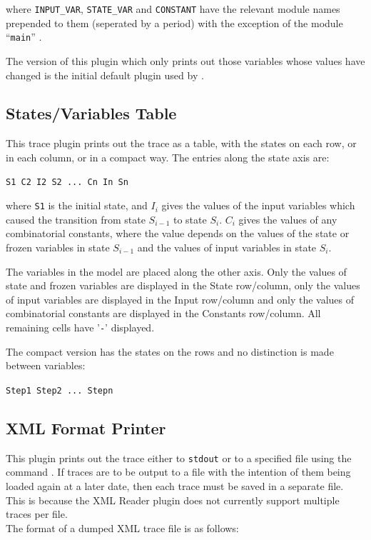 where \texttt{INPUT\_VAR}, \texttt{STATE\_VAR} and \texttt{CONSTANT}
have the relevant module names prepended to them (seperated by a
period) with the exception of the module ``\texttt{main}'' .

The version of this plugin which only prints out those variables whose
values have changed is the initial default plugin used by \nusmv.


\subsection{States/Variables Table}
\label{States/Variables Table}

This trace plugin prints out the trace as a table, with the
states on each row, or in each column, or in a compact way. The entries along
the state axis are:

\begin{center}
\texttt{S1 C2 I2 S2 ...~Cn In Sn}
\end{center}

where \texttt{S1} is the initial state, and \texttt{$I_i$} gives the
values of the input variables which caused the transition from state
\texttt{$S_{i-1}$} to state \texttt{$S_i$}. \texttt{$C_i$} gives the
values of any combinatorial constants, where the value depends on the
values of the state or frozen variables in state \texttt{$S_{i-1}$} and the
values of input variables in state \texttt{$S_i$}.

The variables in the model are placed along the other axis. Only the
values of state and frozen variables are displayed in the
State row/column, only
the values of input variables are displayed in the Input row/column
and only the values of combinatorial constants are displayed in the
Constants row/column. All remaining cells have '\texttt{-}' displayed.

The compact version has the states on the rows and no distinction is made
between variables:

\begin{center}
\texttt{Step1 Step2 ...~Stepn}
\end{center}

\subsection{XML Format Printer}
\label{XML Format Printer}

This plugin prints out the trace either to \texttt{stdout} or to a
specified file using the command .  If traces
are to be output to a file with the intention of them being loaded
again at a later date, then each trace must be saved in a separate
file. This is because the XML Reader plugin does not currently support
multiple traces per file.\\The format of a dumped XML trace file is as
follows:

